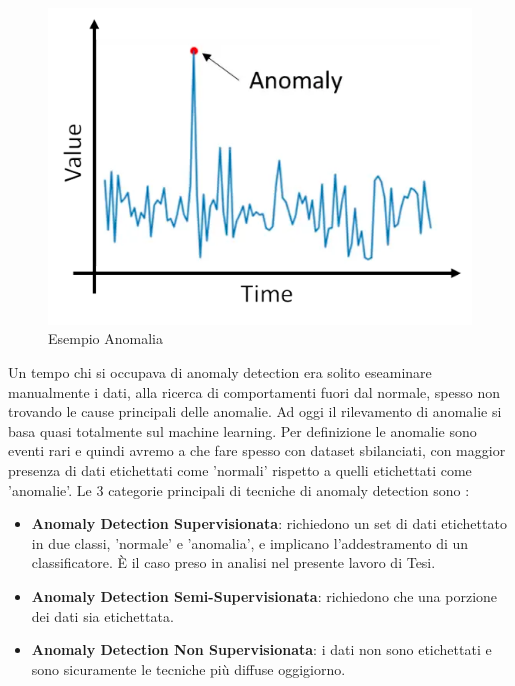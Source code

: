 \begin{figure}[H]
    \centering
    \includegraphics[width=0.6\linewidth]{anomalie.png}
    \caption{Esempio Anomalia}
    \label{fig:enter-label}
\end{figure}


Un tempo chi si occupava di anomaly detection era solito eseaminare manualmente i dati, alla ricerca di comportamenti fuori dal normale, spesso non trovando le cause principali delle anomalie. Ad oggi il rilevamento di anomalie si basa quasi totalmente sul machine learning. Per definizione le anomalie sono eventi rari e quindi avremo a che fare spesso con dataset sbilanciati, con maggior presenza di dati etichettati come 'normali' rispetto a quelli etichettati come 'anomalie'.
Le 3 categorie principali di tecniche di anomaly detection sono \cite{anomaly} :

\begin{itemize}

  \item \textbf{Anomaly Detection Supervisionata}: richiedono un set di dati etichettato in due classi, 'normale' e 'anomalia', e implicano l'addestramento di un classificatore. \`E il caso preso in analisi nel presente lavoro di Tesi.
  
  \item \textbf{Anomaly Detection Semi-Supervisionata}: richiedono che una porzione dei dati sia etichettata.

  \item \textbf{Anomaly Detection Non Supervisionata}: i dati non sono etichettati e sono sicuramente le tecniche pi\`u diffuse oggigiorno.

  
    
\end{itemize}

